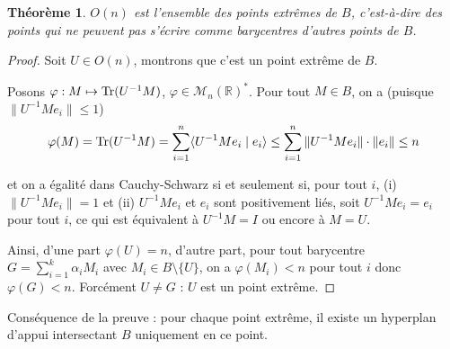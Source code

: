 \documentclass[a4paper, 11pt]{article}
\def\R{\mathbb{R}}
\def\M{\mathcal{M}}
\def\Tr{\textnormal{Tr}}
\newtheorem*{theorem}{Théorème}
\newtheorem*{corollary}{Corollaire}
\begin{document}
\begin{theorem}
  $O(n)$ est l'ensemble des \emph{points extrêmes} de $B$, c'est-à-dire des
  points qui ne peuvent pas s'écrire comme barycentres d'autres points de $B$.
\end{theorem}

\begin{proof}
Soit $U \in O(n)$, montrons que c'est un point extrême de $B$.

Posons $\varphi : M \mapsto \Tr(U^{-1}M)$, $\varphi \in \M_n(\R)^*$. Pour
tout $M \in B$, on a (puisque $\| U^{-1}M e_i \| \leq 1$)
\[ \varphi(M) = \Tr(U^{-1}M) = \sum_{i=1}^n \langle U^{-1}M e_i \mid e_i \rangle
  \leq \sum_{i=1}^n \| U^{-1}M e_i \| \cdot \| e_i \| \leq n \]

et on a égalité dans Cauchy-Schwarz si et seulement si,
pour tout $i$, (i) $\| U^{-1}M e_i \| = 1$ et (ii) $U^{-1}M e_i$ et $e_i$ sont
positivement liés, soit $U^{-1}M e_i = e_i$ pour tout $i$, ce qui est équivalent
à $U^{-1}M = I$ ou encore à $M = U$.

Ainsi, d'une part $\varphi(U) = n$, d'autre part, pour tout barycentre $G =
\sum_{i=1}^k \alpha_i M_i$ avec $M_i \in B \setminus \{U\}$, on a $\varphi(M_i) <
n$ pour tout $i$ donc $\varphi(G) < n$. Forcément $U \neq G$ : $U$ est un point
extrême.
\end{proof}

Conséquence de la preuve : pour chaque point extrême, il existe un hyperplan
d'appui intersectant $B$ uniquement en ce point.


\end{document}
